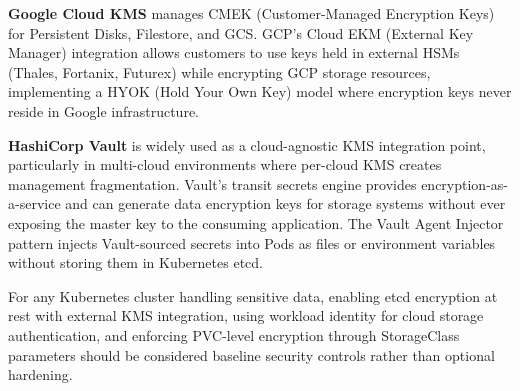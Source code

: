 \textbf{Google Cloud KMS} manages CMEK (Customer-Managed Encryption Keys) for Persistent Disks, Filestore, and GCS. GCP's Cloud EKM (External Key Manager) integration allows customers to use keys held in external HSMs (Thales, Fortanix, Futurex) while encrypting GCP storage resources, implementing a HYOK (Hold Your Own Key) model where encryption keys never reside in Google infrastructure.

\textbf{HashiCorp Vault} is widely used as a cloud-agnostic KMS integration point, particularly in multi-cloud environments where per-cloud KMS creates management fragmentation. Vault's transit secrets engine provides encryption-as-a-service and can generate data encryption keys for storage systems without ever exposing the master key to the consuming application. The Vault Agent Injector pattern injects Vault-sourced secrets into Pods as files or environment variables without storing them in Kubernetes etcd.

For any Kubernetes cluster handling sensitive data, enabling etcd encryption at rest with external KMS integration, using workload identity for cloud storage authentication, and enforcing PVC-level encryption through StorageClass parameters should be considered baseline security controls rather than optional hardening.


